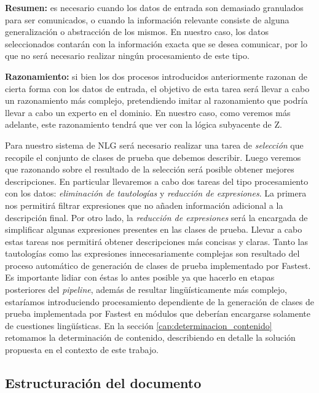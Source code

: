\bigskip
\noindent
\textbf{Resumen:} es necesario cuando los datos de entrada son demasiado granulados para ser comunicados, o cuando la información relevante consiste de alguna generalización o abstracción de los mismos. En nuestro caso, los datos seleccionados contarán con la información exacta que se desea comunicar, por lo que no será necesario realizar ningún procesamiento de este tipo.

\bigskip
\noindent
\textbf{Razonamiento:} si bien los dos procesos introducidos anteriormente razonan de cierta forma con los datos de entrada, el objetivo de esta tarea será llevar a cabo un razonamiento más complejo, pretendiendo imitar al razonamiento que podría llevar a cabo un experto en el dominio. En nuestro caso, como veremos más adelante, este razonamiento tendrá que ver con la lógica subyacente de Z.

\bigskip
Para nuestro sistema de NLG será necesario realizar una tarea de \emph{selección} que recopile el conjunto de clases de prueba que debemos describir. Luego veremos que razonando sobre el resultado de la selección será posible obtener mejores descripciones. En particular llevaremos a cabo dos tareas del tipo procesamiento con los datos: \emph{eliminación de tautologías} y \emph{reducción de expresiones}. La primera nos permitirá filtrar expresiones que no añaden información adicional a la descripción final. Por otro lado, la \emph{reducción de expresiones} será la encargada de simplificar algunas expresiones presentes en las clases de prueba. Llevar a cabo estas tareas nos permitirá obtener descripciones más concisas y claras. Tanto las tautologías como las expresiones innecesariamente complejas son resultado del proceso automático de generación de clases de prueba implementado por Fastest. Es importante lidiar con éstas lo antes posible ya que hacerlo en etapas posteriores del \textit{pipeline}, además de resultar lingüísticamente más complejo, estaríamos introduciendo procesamiento dependiente de la generación de clases de prueba implementada por Fastest en módulos que deberían encargarse solamente de cuestiones lingüísticas. En la sección \ref{cap:determinacion_contenido} retomamos la determinación de contenido, describiendo en detalle la solución propuesta en el contexto de este trabajo.

\subsection*{Estructuración del documento}

